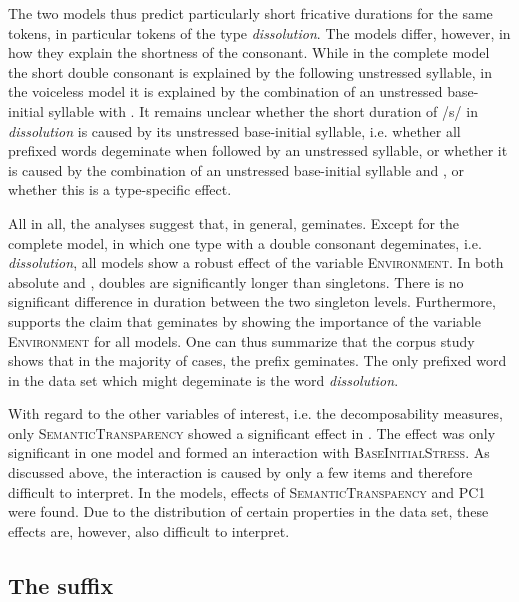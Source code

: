 The two  models thus predict particularly short fricative durations for the same tokens, in particular tokens of the type \textit{dissolution}. The models differ, however, in how they explain the shortness of the consonant. While in the complete model the short double consonant is explained by the following unstressed syllable, in the voiceless model it is explained by the combination of an unstressed base-initial syllable with . It remains unclear whether the short duration of /s/ in \textit{dissolution} is caused by its unstressed base-initial syllable, i.e. whether all prefixed words degeminate when followed by an unstressed syllable, or whether it is caused by the combination of an unstressed base-initial syllable and , or whether this is a type-specific effect.\largerpage


All in all, the analyses suggest that, in general,  geminates. Except for the complete  model, in which one type with a double consonant degeminates, i.e. \textit{dissolution}, all  models show a robust effect of the variable \textsc{Environment}. In both absolute and , doubles are significantly longer than singletons. There is no significant difference in duration between the two singleton levels. Furthermore,  supports the claim that  geminates by showing the importance of the variable \textsc{Environment} for all models. 
One can thus summarize that the corpus study shows that in the majority of cases, the prefix  geminates. The only prefixed word in the data set which might degeminate is the word \textit{dissolution}.

With regard to the other variables of interest, i.e. the decomposability measures, only \textsc{SemanticTransparency} showed a significant effect in . The effect was only significant in one model and formed an interaction with \textsc{BaseInitialStress}. As discussed above, the interaction is  caused by only a few items and therefore difficult to interpret.
 In the  models, effects of \textsc{SemanticTranspaency} and \textsc{PC1} were found. Due to the distribution of certain properties in the data set, these effects are, however, also difficult to interpret. 


\subsection{The suffix }
